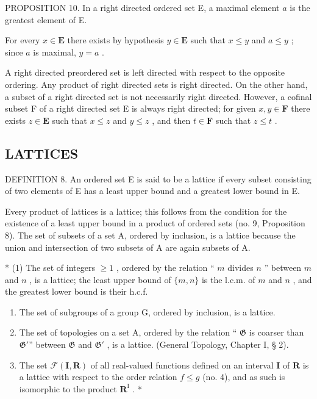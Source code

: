 PROPOSITION 10. In a right directed ordered set E, a maximal element \(a\) is the greatest element of E.

For every \(x \in \mathbf{E}\) there exists by hypothesis \(y \in \mathbf{E}\) such that \(x \leqslant y\) and \(a \leqslant y\) ; since \(a\) is maximal, \(y = a\) .

A right directed preordered set is left directed with respect to the opposite ordering. Any product of right directed sets is right directed. On the other hand, a subset of a right directed set is not necessarily right directed. However, a cofinal subset F of a right directed set E is always right directed; for given \(x, y \in \mathbf{F}\) there exists \(z \in \mathbf{E}\) such that \(x \leqslant z\) and \(y \leqslant z\) , and then \(t \in \mathbf{F}\) such that \(z \leqslant t\) .

\subsection{LATTICES}

DEFINITION 8. An ordered set E is said to be a lattice if every subset consisting of two elements of E has a least upper bound and a greatest lower bound in E.

Every product of lattices is a lattice; this follows from the condition for the existence of a least upper bound in a product of ordered sets (no. 9, Proposition 8). The set of subsets of a set A, ordered by inclusion, is a lattice because the union and intersection of two subsets of A are again subsets of A.


* (1) The set of integers \(\geqslant 1\) , ordered by the relation `` \(m\) divides \(n\) '' between \(m\) and \(n\) , is a lattice; the least upper bound of \(\{m, n\}\) is the l.c.m. of \(m\) and \(n\) , and the greatest lower bound is their h.c.f.

\begin{enumerate}
\def\labelenumi{(\arabic{enumi})}
\setcounter{enumi}{1}
\item
  The set of subgroups of a group G, ordered by inclusion, is a lattice.
\item
  The set of topologies on a set A, ordered by the relation `` \(\mathfrak{G}\) is coarser than \(\mathfrak{G}'\)'' between \(\mathfrak{G}\) and \(\mathfrak{G}'\) , is a lattice. (General Topology, Chapter I, § 2).
\item
  The set \(\mathcal{F}(\mathbf{I},\mathbf{R})\) of all real-valued functions defined on an interval \(\mathbf{I}\) of \(\mathbf{R}\) is a lattice with respect to the order relation \(f\leqslant g\) (no. 4), and as such is isomorphic to the product \(\mathbf{R}^{\mathrm{I}}\) . *
\end{enumerate}

